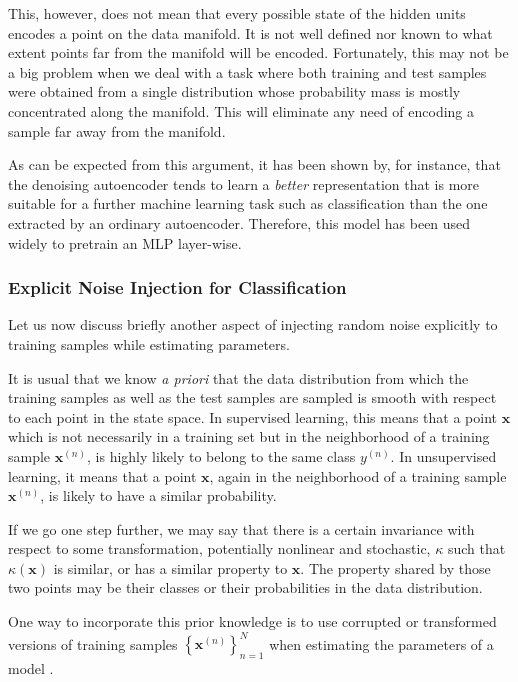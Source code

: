 \documentclass[dissertation,nocontribution]{aaltoseries}
\newcommand{\vect}[1]{\mathbf{#1}}
\newcommand{\vx}[0]{\vect{x}}
\begin{document}
This, however, does not mean that every possible state of
the hidden units encodes a point on the data manifold. It is
not well defined nor known to what extent points far from the
manifold will be encoded. Fortunately, this may not be a big
problem when we deal with a task where both training and
test samples were obtained from a single
distribution whose probability mass is mostly concentrated
along the manifold. This will eliminate any need of encoding
a sample far away from the manifold.

As can be expected from this argument, it has been shown by,
for instance, \citet{Vincent2010}
that the
denoising autoencoder tends to learn a \textit{better}
representation that is more suitable for a further machine
learning task such as classification than the one extracted
by an ordinary autoencoder. Therefore, this model
has been used widely to pretrain an MLP layer-wise.

\subsubsection{Explicit Noise Injection for Classification}
\label{sec:noise_injection}

Let us now discuss briefly another aspect of injecting random
noise explicitly to training samples while estimating
parameters.

It is usual that we know \textit{a priori} that the data
distribution from which the training samples as well as
the test samples are sampled is smooth with respect to each
point in the state space. In supervised learning, this
means that a point $\vx$ which is not necessarily in a
training set but in the neighborhood of a training sample
$\vx^{(n)}$, is highly likely to belong to the same class
$y^{(n)}$. In unsupervised learning, it means that a point
$\vx$, again in the neighborhood of a training sample
$\vx^{(n)}$, is likely to have a similar probability.

If we go one step further, we may say that there is a
certain invariance with respect to some transformation,
potentially nonlinear and stochastic, $\kappa$ such that
$\kappa(\vx)$ is similar, or has a similar property to
$\vx$. The property shared by those two points may be their
classes or their probabilities in the data distribution.

One way to incorporate this prior
knowledge is to use corrupted or transformed versions of training
samples $\left\{ \vx^{(n)} \right\}_{n=1}^N$ when estimating the
parameters of a model \citep[see, e.g.,][Chapter
5.5]{Bishop2006}. 
\end{document}

